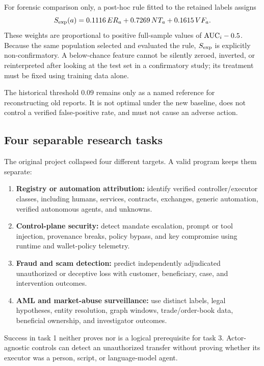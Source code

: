 For forensic comparison only, a post-hoc rule fitted to the retained labels
assigns
\begin{equation}\label{eq:exploratory_score}
  S_{\rm exp}(a)=0.1116\,ER_a+0.7269\,NT_a+0.1615\,VF_a.
\end{equation}
These weights are proportional to positive full-sample values of
$\mathrm{AUC}_i-0.5$.  Because the same population selected and evaluated the rule,
$S_{\rm exp}$ is explicitly non-confirmatory.  A below-chance feature cannot
be silently zeroed, inverted, or reinterpreted after looking at the test set in
a confirmatory study; its treatment must be fixed using training data alone.

The historical threshold $0.09$ remains only as a named reference for
reconstructing old reports.  It is not optimal under the new baseline, does not
control a verified false-positive rate, and must not cause an adverse action.

\subsection{Four separable research tasks}

The original project collapsed four different targets.  A valid program keeps
them separate:

\begin{enumerate}[leftmargin=2em]
  \item \textbf{Registry or automation attribution:} identify verified
    controller/executor classes, including humans, services, contracts,
    exchanges, generic automation, verified autonomous agents, and unknowns.
  \item \textbf{Control-plane security:} detect mandate escalation, prompt or
    tool injection, provenance breaks, policy bypass, and key compromise using
    runtime and wallet-policy telemetry.
  \item \textbf{Fraud and scam detection:} predict independently adjudicated
    unauthorized or deceptive loss with customer, beneficiary, case, and
    intervention outcomes.
  \item \textbf{AML and market-abuse surveillance:} use distinct labels,
    legal hypotheses, entity resolution, graph windows, trade/order-book data,
    beneficial ownership, and investigator outcomes.
\end{enumerate}

Success in task 1 neither proves nor is a logical prerequisite for task 3.
Actor-agnostic controls can detect an unauthorized transfer without proving
whether its executor was a person, script, or language-model agent.

